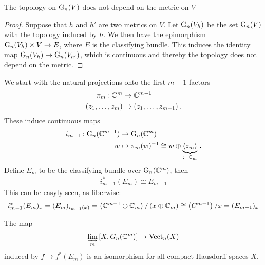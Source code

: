 \begin{lemma}
	The topology on $\mathrm{G}_n(V)$ does not depend on the metric on $V$
\end{lemma}
\begin{proof}
	Suppose that $h$ and $h'$ are two metrics on $V$. Let $\mathrm{G}_n(V_h)$ be the set $\mathrm{G}_n(V)$ with the topology induced by $h$. We then have the epimorphism $\mathrm{G}_n(V_h)\times V\to E$, where $E$ is the classifying bundle. This induces the identity map $\mathrm{G}_n(V_h)\to \mathrm{G}_n(V_{h'})$, which is continuous and thereby the topology does not depend on the metric.
\end{proof}
\begin{definition}
	We start with the natural projections onto the first $m-1$ factors
	\begin{align*}
		\pi_m :\mathbb{C}^m &\to \mathbb{C}^{m-1}\\
		(z_1,\dots,z_m)& \mapsto (z_1,\dots,z_{m-1})\, .
	\end{align*}These induce continuous maps
	\begin{align*}
		i_{m-1}: \mathrm{G}_n(\mathbb{C}^{m-1})         & \to \mathrm{G}_n(\mathbb{C}^m)\\
		w                               & \mapsto \pi_m(w)^{-1}\cong w\oplus \underbrace{\langle z_m \rangle}_{:=\mathbb{C}_m}  \, .
	\end{align*}
	Define $E_m$ to be the classifying bundle over $\mathrm{G}_n(\mathbb{C}^m)$,  then
	\begin{align*}
		i_{m-1}^*(E_m)\cong E_{m-1}
	\end{align*}
	This can be easyly seen, as fiberwise:
	\begin{align*}
		i_{m-1}^*(E_m)_x=(E_m)_{i_{m-1}(x)}= \left(\mathbb{C}^{m-1}\oplus \mathbb{C}_m \right)\slash \left( x \oplus \mathbb{C}_m \right)\cong \left( C^{m-1}\right)\slash x=(E_{m-1})_x
	\end{align*}
\end{definition}
\newpage
\begin{theorem}
	The map
	\begin{align*}
		\varinjlim_{m}\,[X,G_n(\mathbb{C}^m)]\to \operatorname{\mathrm{Vect}}_n(X)
	\end{align*} induced by $f\mapsto f^*(E_m)$ is an isomorphism for all compact Hausdorff spaces $X$.
\end{theorem} 
